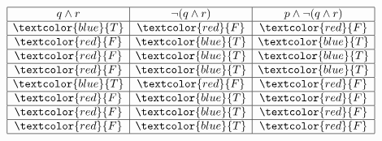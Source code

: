 \documentclass[12pt, letterpaper]{article}
\begin{document}
\begin{displaymath}
    \begin{array}{|c|c|c|}
    \hline
    q \land r & \neg(q \land r) & p \land \neg(q \land r) \\ %
    \hline %
    \textcolor{blue}{T} & \textcolor{red}{F} & \textcolor{red}{F}\\
    \hline
    \textcolor{red}{F} & \textcolor{blue}{T} & \textcolor{blue}{T}\\
    \hline
    \textcolor{red}{F} & \textcolor{blue}{T} & \textcolor{blue}{T}\\
    \hline
    \textcolor{red}{F} & \textcolor{blue}{T} & \textcolor{blue}{T}\\
    \hline
    \textcolor{blue}{T} & \textcolor{red}{F} & \textcolor{red}{F}\\
    \hline
    \textcolor{red}{F} & \textcolor{blue}{T} & \textcolor{red}{F}\\
    \hline
    \textcolor{red}{F} & \textcolor{blue}{T} & \textcolor{red}{F}\\
    \hline
    \textcolor{red}{F} & \textcolor{blue}{T} & \textcolor{red}{F}\\
    \hline
    \end{array}
\end{displaymath} \\
\end{document}
